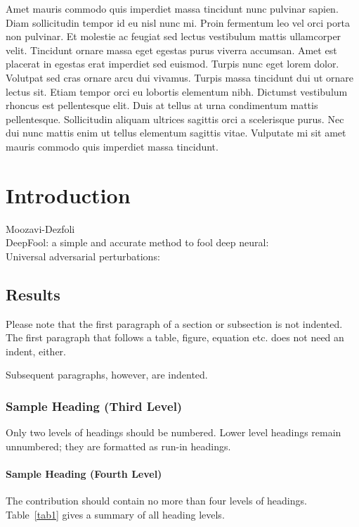 \documentclass[runningheads]{llncs}
\begin{document}
Amet mauris commodo quis imperdiet massa tincidunt nunc pulvinar sapien. Diam sollicitudin tempor id eu nisl nunc mi. Proin fermentum leo vel orci porta non pulvinar. Et molestie ac feugiat sed lectus vestibulum mattis ullamcorper velit. Tincidunt ornare massa eget egestas purus viverra accumsan. Amet est placerat in egestas erat imperdiet sed euismod. Turpis nunc eget lorem dolor. Volutpat sed cras ornare arcu dui vivamus. Turpis massa tincidunt dui ut ornare lectus sit. Etiam tempor orci eu lobortis elementum nibh. Dictumst vestibulum rhoncus est pellentesque elit. Duis at tellus at urna condimentum mattis pellentesque. Sollicitudin aliquam ultrices sagittis orci a scelerisque purus. Nec dui nunc mattis enim ut tellus elementum sagittis vitae. Vulputate mi sit amet mauris commodo quis imperdiet massa tincidunt.


\section{Introduction}
Moozavi-Dezfoli\cite{fawzi_robustness_2017}\\
DeepFool: a simple and accurate method to fool deep neural:\cite{moosavi-dezfooli_deepfool_2016}\\
Universal adversarial perturbations:\cite{moosavi-dezfooli_universal_2017}
\subsection{Results}
Please note that the first paragraph of a section or subsection is
not indented. The first paragraph that follows a table, figure,
equation etc. does not need an indent, either.

Subsequent paragraphs, however, are indented.

\subsubsection{Sample Heading (Third Level)} Only two levels of
headings should be numbered. Lower level headings remain unnumbered;
they are formatted as run-in headings.

\paragraph{Sample Heading (Fourth Level)}
The contribution should contain no more than four levels of
headings. Table~\ref{tab1} gives a summary of all heading levels.
\end{document}
